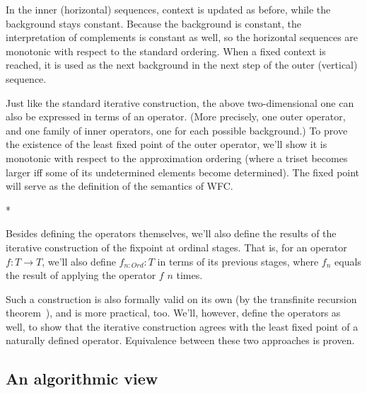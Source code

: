 \documentclass[oneside,12pt]{book}
\theoremstyle{definition}
\theoremstyle{remark}
\newcommand{\sectionStars}{
\bigskip
*\quad*\quad*
\medskip
}
\begin{document}
In the inner (horizontal) sequences, context is updated as before,
while the background stays constant. Because the background is constant,
the interpretation of complements is constant as well, so the horizontal
sequences are monotonic with respect to the standard ordering.
When a fixed context is reached, it is used as the next background in the next
step of the outer (vertical) sequence.

Just like the standard iterative construction, the above two-dimensional one
can also be expressed in terms of an operator. (More precisely, one outer
operator, and one family of inner operators, one for each possible background.)
To prove the existence of the least fixed point of the outer operator, we'll show
it is monotonic with respect to the approximation ordering (where a triset
becomes larger iff some of its undetermined elements become determined).
The fixed point will serve as the definition of the semantics of WFC.

\sectionStars

\noindent Besides defining the operators themselves, we'll also define the results
of the iterative construction of the fixpoint at ordinal stages. That is, for
an operator $f\colon T \to T$, we'll also define $f_{n\colon Ord}\colon T$
in terms of its previous stages, where $f_n$ equals the result of applying
the operator $f$ $n$ times.

Such a construction is also formally valid on its own (by the transfinite recursion
theorem~\cite{Rin2014TransfiniteRA}), and is more practical, too. We'll,
however, define the operators as well, to show that the iterative construction
agrees with the least fixed point of a naturally defined operator.
Equivalence between these two approaches is proven.

\subsection{An algorithmic view}
\end{document}
